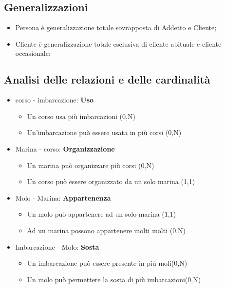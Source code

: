 \subsection{Generalizzazioni}

\begin{itemize}
    \item Persona è generalizzazione totale sovrapposta di Addetto e Cliente;
    \item Cliente è generalizzazione totale esclusiva di cliente abituale e cliente occasionale;
\end{itemize}

\subsection{Analisi delle relazioni e delle cardinalità}

\begin{itemize}
    \item corso - imbarcazione: \textbf{Uso}
    \begin{itemize}
        \item Un corso usa più imbarcazioni (0,N)
        \item Un'imbarcazione può essere usata in più corsi (0,N)
    \end{itemize}
    
    \item Marina - corso: \textbf{Organizzazione}
    \begin{itemize}
        \item Un marina può organizzare più corsi (0,N)
        \item Un corso può essere organizzato da un solo marina (1,1)
    \end{itemize}
    
    \item Molo - Marina: \textbf{Appartenenza}
    \begin{itemize}
        \item Un molo può appartenere ad un solo marina (1,1)
        \item Ad un marina possono appartenere molti molti (0,N)
    \end{itemize}
    
    \item Imbarcazione - Molo: \textbf{Sosta}
    \begin{itemize}
        \item Un imbarcazione può essere presente in più moli(0,N)
        \item Un molo può permettere la sosta di più imbarcazioni(0,N)
    \end{itemize}
\end{itemize}

